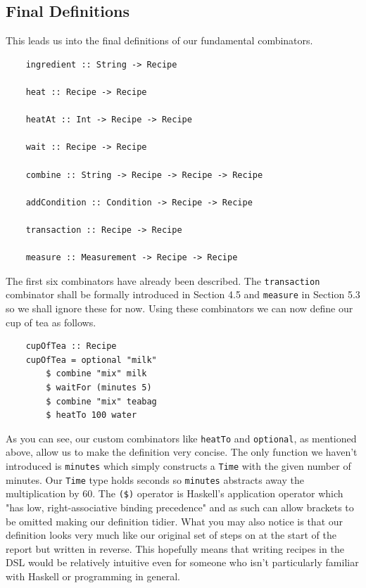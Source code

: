 \documentclass[11pt]{article}
\begin{document}
\subsection{Final Definitions}

This leads us into the final definitions of our fundamental combinators.

\begin{lstlisting}
    ingredient :: String -> Recipe

    heat :: Recipe -> Recipe

    heatAt :: Int -> Recipe -> Recipe

    wait :: Recipe -> Recipe

    combine :: String -> Recipe -> Recipe -> Recipe

    addCondition :: Condition -> Recipe -> Recipe

    transaction :: Recipe -> Recipe

    measure :: Measurement -> Recipe -> Recipe
\end{lstlisting}

The first six combinators have already been described. The \texttt{transaction} combinator
shall be formally introduced in Section 4.5 and \texttt{measure} in Section 5.3 so we shall
ignore these for now. Using these combinators we can now define our cup of tea as follows.

\begin{lstlisting}
    cupOfTea :: Recipe
    cupOfTea = optional "milk"
        $ combine "mix" milk
        $ waitFor (minutes 5)
        $ combine "mix" teabag
        $ heatTo 100 water
\end{lstlisting}

As you can see, our custom combinators like \texttt{heatTo} and \texttt{optional},
as mentioned above, allow us to make the definition very concise. The only function
we haven't introduced is \texttt{minutes} which simply constructs a \texttt{Time} with
the given number of minutes. Our \texttt{Time} type holds seconds so \texttt{minutes}
abstracts away the multiplication by 60. The \texttt{(\$)} operator is Haskell's
application operator which "has low, right-associative binding precedence"\cite{haskell-docs} and
as such can allow brackets to be omitted making our definition tidier. What you may
also notice is that our definition looks very much like our original set of steps
on at the start of the report but written in reverse. This hopefully means that
writing recipes in the DSL would be relatively intuitive even for someone who
isn't particularly familiar with Haskell or programming in general.
\end{document}
